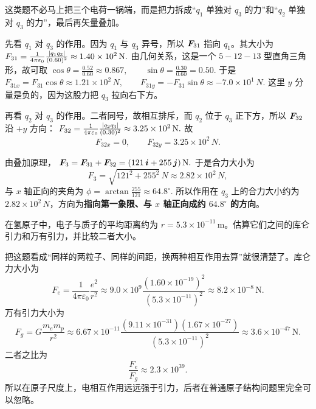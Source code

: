 \documentclass[lang=cn,11pt]{elegantbook}
\begin{document}
\begin{solution}
这类题不必马上把三个电荷一锅端，而是把力拆成“\(q_1\) 单独对 \(q_3\) 的力”和“\(q_2\) 单独对 \(q_3\) 的力”，最后再矢量叠加。

先看 \(q_1\) 对 \(q_3\) 的作用。因为 \(q_1\) 与 \(q_3\) 异号，所以 \(\vb*{F}_{31}\) 指向 \(q_1\)。其大小为
 \(F_{31} =\frac{1}{4\pi\varepsilon_0}\frac{\abs{q_1q_3}}{(0.60)^2} \approx 1.40\times 10^2\,\si{N}.\) 
由几何关系，这是一个 \(5\!-\!12\!-\!13\) 型直角三角形，故可取
 \(\cos\theta=\frac{0.52}{0.60}\approx 0.867,\qquad \sin\theta=\frac{0.30}{0.60}=0.50.\) 
于是
 \(F_{31x}=F_{31}\cos\theta\approx 1.21\times 10^2\,\si{N}, \qquad F_{31y}=-F_{31}\sin\theta\approx -7.0\times 10^1\,\si{N}.\) 
这里 \(y\) 分量是负的，因为这股力把 \(q_3\) 拉向右下方。

再看 \(q_2\) 对 \(q_3\) 的作用。二者同号，故相互排斥，而 \(q_2\) 位于 \(q_3\) 正下方，所以 \(\vb*{F}_{32}\) 沿 \(+y\) 方向：
 \(F_{32} =\frac{1}{4\pi\varepsilon_0}\frac{\abs{q_2q_3}}{(0.30)^2} \approx 3.25\times 10^2\,\si{N}.\) 
故
\[
F_{32x}=0,\qquad F_{32y}=3.25\times 10^2\,\si{N}.
\]

由叠加原理，
 \(\vb*{F}_3 =\vb*{F}_{31}+\vb*{F}_{32} =(121\,\vb*{i}+255\,\vb*{j})\,\si{N}.\) 
于是合力大小为
\[
F_3=\sqrt{121^2+255^2}\,\si{N}\approx 2.82\times 10^2\,\si{N},
\]
与 \(x\) 轴正向的夹角为
 \(\phi=\arctan\frac{255}{121}\approx 64.8^\circ.\) 
所以作用在 \(q_3\) 上的合力大小约为 \(2.82\times 10^2\,\si{N}\)，方向为\textbf{指向第一象限、与 \(x\) 轴正向成约 \(64.8^\circ\) 的方向}。
\end{solution}

\begin{exercise}[氢原子中库仑力与万有引力的量级比较]
在氢原子中，电子与质子的平均距离约为 \(r=5.3\times 10^{-11}\,\mathrm{m}\)。估算它们之间的库仑引力和万有引力，并比较二者大小。
\end{exercise}

\begin{solution}
把这题看成“同样的两粒子、同样的间距，换两种相互作用去算”就很清楚了。库仑力大小为
\[
F_e=\frac{1}{4\pi\varepsilon_0}\frac{e^2}{r^2}
\approx 9.0\times 10^9
\frac{(1.60\times 10^{-19})^2}{(5.3\times 10^{-11})^2}
\approx 8.2\times 10^{-8}\,\mathrm{N}.
\]
万有引力大小为
\[
F_g=G\frac{m_em_p}{r^2}
\approx 6.67\times 10^{-11}
\frac{(9.11\times 10^{-31})(1.67\times 10^{-27})}{(5.3\times 10^{-11})^2}
\approx 3.6\times 10^{-47}\,\mathrm{N}.
\]
二者之比为
\[
\frac{F_e}{F_g}\approx 2.3\times 10^{39}.
\]
所以在原子尺度上，电相互作用远远强于引力，后者在普通原子结构问题里完全可以忽略。
\end{solution}
\end{document}
